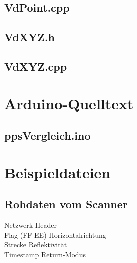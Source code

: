 \documentclass[a4paper,12pt,bibliography=totoc, listof=totoc,titlepage,pointlessnumbers]{scrreprt}
\begin{document}
\begin{appendices}
\section{VdPoint.cpp}
\label{a:VdPoint.cpp}


\section{VdXYZ.h}
\label{a:VdXYZ.h}


\section{VdXYZ.cpp}
\label{a:VdXYZ.cpp}


\chapter{Arduino-Quelltext}
\section{ppsVergleich.ino}
\label{a:ppsVergleich.ino}


\chapter{Beispieldateien}

\section{Rohdaten vom Scanner}
\label{a:Rohdaten}

{\color{gray} Netzwerk-Header}\\
{\color{red} Flag (FF EE)} {\color{green} Horizontalrichtung}\\
{\color{blue} Strecke} {\color{orange} Reflektivität}\\
{\color{yellow} Timestamp } {\color{violet} Return-Modus}\\
\\


\end{appendices}
\end{document}
